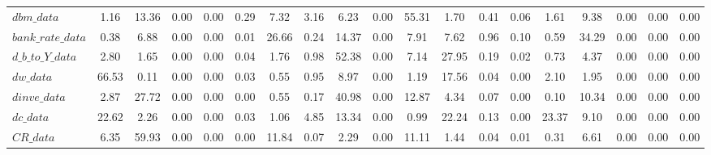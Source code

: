 \begin{center}
\begin{longtable}{lcccccccccccccccccc}
$dbm\_data          $	 & 	             1.16	 & 	            13.36	 & 	             0.00	 & 	             0.00	 & 	             0.29	 & 	             7.32	 & 	             3.16	 & 	             6.23	 & 	             0.00	 & 	            55.31	 & 	             1.70	 & 	             0.41	 & 	             0.06	 & 	             1.61	 & 	             9.38	 & 	             0.00	 & 	             0.00	 & 	             0.00 \\ 
$bank\_rate\_data   $	 & 	             0.38	 & 	             6.88	 & 	             0.00	 & 	             0.00	 & 	             0.01	 & 	            26.66	 & 	             0.24	 & 	            14.37	 & 	             0.00	 & 	             7.91	 & 	             7.62	 & 	             0.96	 & 	             0.10	 & 	             0.59	 & 	            34.29	 & 	             0.00	 & 	             0.00	 & 	             0.00 \\ 
$d\_b\_to\_Y\_data  $	 & 	             2.80	 & 	             1.65	 & 	             0.00	 & 	             0.00	 & 	             0.04	 & 	             1.76	 & 	             0.98	 & 	            52.38	 & 	             0.00	 & 	             7.14	 & 	            27.95	 & 	             0.19	 & 	             0.02	 & 	             0.73	 & 	             4.37	 & 	             0.00	 & 	             0.00	 & 	             0.00 \\ 
$dw\_data           $	 & 	            66.53	 & 	             0.11	 & 	             0.00	 & 	             0.00	 & 	             0.03	 & 	             0.55	 & 	             0.95	 & 	             8.97	 & 	             0.00	 & 	             1.19	 & 	            17.56	 & 	             0.04	 & 	             0.00	 & 	             2.10	 & 	             1.95	 & 	             0.00	 & 	             0.00	 & 	             0.00 \\ 
$dinve\_data        $	 & 	             2.87	 & 	            27.72	 & 	             0.00	 & 	             0.00	 & 	             0.00	 & 	             0.55	 & 	             0.17	 & 	            40.98	 & 	             0.00	 & 	            12.87	 & 	             4.34	 & 	             0.07	 & 	             0.00	 & 	             0.10	 & 	            10.34	 & 	             0.00	 & 	             0.00	 & 	             0.00 \\ 
$dc\_data           $	 & 	            22.62	 & 	             2.26	 & 	             0.00	 & 	             0.00	 & 	             0.03	 & 	             1.06	 & 	             4.85	 & 	            13.34	 & 	             0.00	 & 	             0.99	 & 	            22.24	 & 	             0.13	 & 	             0.00	 & 	            23.37	 & 	             9.10	 & 	             0.00	 & 	             0.00	 & 	             0.00 \\ 
$CR\_data           $	 & 	             6.35	 & 	            59.93	 & 	             0.00	 & 	             0.00	 & 	             0.00	 & 	            11.84	 & 	             0.07	 & 	             2.29	 & 	             0.00	 & 	            11.11	 & 	             1.44	 & 	             0.04	 & 	             0.01	 & 	             0.31	 & 	             6.61	 & 	             0.00	 & 	             0.00	 & 	             0.00 \\ 
\end{longtable}
 \end{center}
